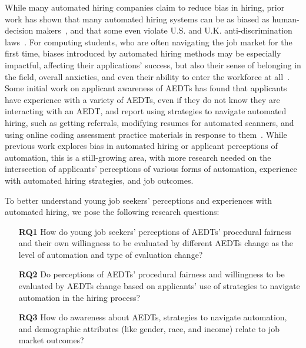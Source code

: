 While many automated hiring companies claim to reduce bias in hiring, prior work has shown that many automated hiring systems can be as biased as human-decision makers~\cite{caliskan2017semantics}, and that some even violate U.S. and U.K. anti-discrimination laws~\cite{ajunwa2019paradox, sanchez2020does}. For computing students, who are often navigating the job market for the first time, biases introduced by automated hiring methods may be especially impactful, affecting their applications' success, but also their sense of belonging in the field, overall anxieties, and even their ability to enter the workforce at all~\cite{behroozi2019hiring, kasinidou2021agree}. Some initial work on applicant awareness of AEDTs has found that applicants have experience with a variety of AEDTs, even if they do not know they are interacting with an AEDT, and report using strategies to navigate automated hiring, such as getting referrals, modifying resumes for automated scanners, and using online coding assessment practice materials in response to them~\cite{armstrong2023navigating}. While previous work explores bias in automated hiring or applicant perceptions of automation, this is a still-growing area, with more research needed on the intersection of applicants' perceptions of various forms of automation, experience with automated hiring strategies, and job outcomes. 

To better understand young job seekers' perceptions and experiences with automated hiring, we pose the following research questions: 

\begin{enumerate} 
    \item[\textbf{RQ1}] How do young job seekers' perceptions of AEDTs' procedural fairness and their own willingness to be evaluated by different AEDTs change as the level of automation and type of evaluation change?
    \item[\textbf{RQ2}] Do perceptions of AEDTs' procedural fairness and willingness to be evaluated by AEDTs change based on applicants' use of strategies to navigate automation in the hiring process?
    \item[\textbf{RQ3}] How do awareness about AEDTs, strategies to navigate automation, and demographic attributes (like gender, race, and income) relate to job market outcomes?
\end{enumerate}

